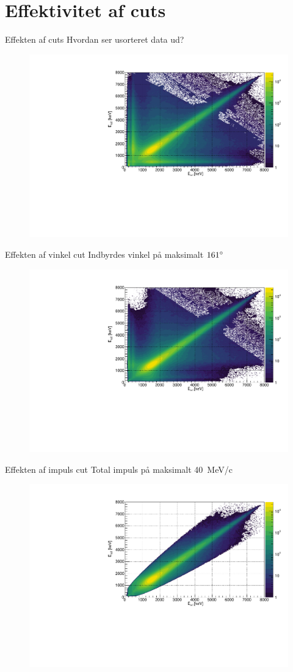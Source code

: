 \section{Effektivitet af cuts}
\begin{frame}{Effekten af cuts}
	Hvordan ser usorteret data ud?\\
	\begin{figure}
		\includegraphics[width=0.7\columnwidth]{../figures/EENoCuts.pdf}
	\end{figure}
\end{frame}

\begin{frame}{Effekten af vinkel cut}
	Indbyrdes vinkel på maksimalt $161\degree$\\
	\begin{figure}
		\includegraphics[width=0.7\columnwidth]{../figures/EEAngleCut.pdf}
	\end{figure}
\end{frame}

\begin{frame}{Effekten af impuls cut}
	Total impuls på maksimalt \SI{40}{MeV/c}
	\begin{figure}
		\includegraphics[width=.7\columnwidth]{../figures/EEMomentumCut.pdf}
	\end{figure}
\end{frame}

